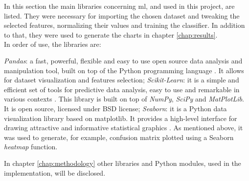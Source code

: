 In this section the main libraries concerning \gls{ml}, and used in this project, are listed. They were necessary for importing the chosen dataset and tweaking the selected features, normalizing their values and training the classifier. In addition to that, they were used to generate the charts in chapter \ref{chap:results}. \\ In order of use, the libraries are:

\begin{itemize}
    \itemAR \textit{Pandas}: a fast, powerful, flexible and easy to use open source data analysis and manipulation tool, built on top of the Python programming language \cite{PandasLibrary}. It allows for dataset visualization and features selection;
    \itemAR \textit{Scikit-Learn}: it is a simple and efficient set of tools for predictive data analysis, easy to use and remarkable in various contexts \cite{ScikitWebsite}. This library is built on top of \textit{NumPy}, \textit{SciPy} and \textit{MatPlotLib}. It is open source, licensed under BSD license;
    \itemAR \textit{Seaborn}: it is a Python data visualization library based on matplotlib. It provides a high-level interface for drawing attractive and informative statistical graphics \cite{SeabornLibrary}. As mentioned above, it was used to generate, for example, confusion matrix plotted using a Seaborn \textit{heatmap} function.
\end{itemize}

\noindent In chapter \ref{chap:methodology} other libraries and Python modules, used in the implementation, will be disclosed.